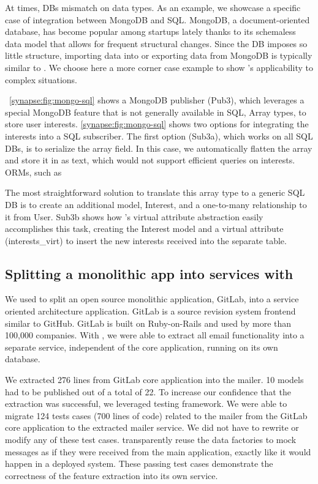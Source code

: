At times, DBs mismatch on data types.  As an example, we showcase a specific
case of integration between MongoDB and SQL.
MongoDB, a document-oriented database, has become popular among startups
lately thanks to its schemaless data model that allows for frequent
structural changes.  Since the DB imposes so little structure, importing data
into or exporting data from MongoDB is typically similar to
\label{synapse:fig:mongo-to-star}. We choose here a more corner case example to
show \synapse's applicability to complex situations.

\F~\ref{synapse:fig:mongo-sql} shows a MongoDB publisher (Pub3), which leverages a
special MongoDB feature that is not generally available in SQL,
Array types, to store user interests.  \F\ref{synapse:fig:mongo-sql} shows two options
for integrating the interests into a SQL subscriber.  The first option (Sub3a),
which works on all SQL DBs, is to serialize the array field.
In this case, we automatically flatten the array and store it in as text, which would not support efficient queries on interests.  ORMs, such as

The most straightforward solution to translate this array type to a generic SQL DB is to create an additional model, {\code \footnotesize Interest}, and a one-to-many relationship to it from {\code \footnotesize User}.
Sub3b shows how \synapse's virtual attribute abstraction easily accomplishes
this task, creating the {\code \footnotesize Interest} model and a virtual
attribute  ({\code \footnotesize interests\_virt}) to insert the new interests
received into the separate table.

\subsection{Splitting a monolithic app into services with \synapse}
\label{synapse:sec:apps:gitlab}

We used \synapse to split an open source monolithic application, GitLab, into a
service oriented architecture application. GitLab is a source revision system
frontend similar to GitHub.  GitLab is built on Ruby-on-Rails and used by more
than 100,000 companies.  With \synapse, we were able to extract all email
functionality into a separate service, independent of the core application,
running on its own database.

We extracted 276 lines from GitLab core application into the mailer.  10 models
had to be published out of a total of 22.  To increase our confidence that the
extraction was successful, we leveraged \synapse testing framework. We were able
to migrate 124 tests cases (700 lines of code) related to the mailer from the
GitLab core application to the extracted mailer service.  We did not have to
rewrite or modify any of these test cases.  \synapse transparently reuse the
data factories to mock \synapse messages as if they were received from the main
application, exactly like it would happen in a deployed system. These passing
test cases demonstrate the correctness of the feature extraction into its own
service.


